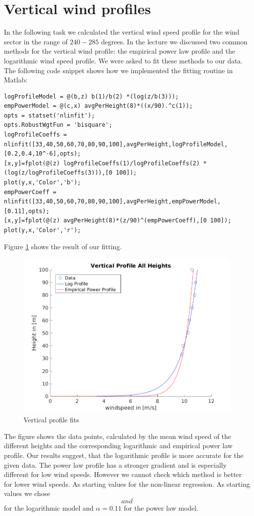 \documentclass[10pt]{article}
\begin{document}
\section{Vertical wind profiles}
In the following task we calculated the vertical wind speed profile for the wind sector in the range of $240 - 285$ degrees. In the lecture we discussed two common methods for the vertical wind profile: the empirical power law profile and the logarithmic wind speed profile. We were asked to fit these methods to our data. The following code snippet shows how we implemented the fitting routine in Matlab:

\begin{lstlisting}
logProfileModel = @(b,z) b(1)/b(2) *(log(z/b(3)));
empPowerModel = @(c,x) avgPerHeight(8)*((x/90).^c(1));
opts = statset('nlinfit');
opts.RobustWgtFun = 'bisquare';
logProfileCoeffs = nlinfit([33,40,50,60,70,80,90,100],avgPerHeight,logProfileModel,[0.2,0.4,10^-6],opts);
[x,y]=fplot(@(z) logProfileCoeffs(1)/logProfileCoeffs(2) *(log(z/logProfileCoeffs(3))),[0 100]);
plot(y,x,'Color','b');
empPowerCoeff = nlinfit([33,40,50,60,70,80,90,100],avgPerHeight,empPowerModel,[0.11],opts);
[x,y]=fplot(@(z) avgPerHeight(8)*(z/90)^(empPowerCoeff),[0 100]);
plot(y,x,'Color','r');
\end{lstlisting}

Figure \ref{fig:verticalfit} shows the result of our fitting.

\begin{figure}[H]
\centering
\includegraphics[width=0.7\linewidth]{../figures/verticalProfileFits.png}
\caption{Vertical profile fits}
\label{fig:verticalfit}
\end{figure}

The figure shows the data points, calculated by the mean wind speed of the different heights and the corresponding logarithmic and empirical power law profile.
Our results suggest, that the logarithmic profile is more accurate for the given data. The power law profile has a stronger gradient and is especially different for low wind speeds. However we cannot check which method is better for lower wind speeds. As starting values for the non-linear regression. As starting values we chose $$ and $$ for the logarithmic model and $\alpha=0.11$ for the power law model.
\newpage
\appendix
\end{document}
